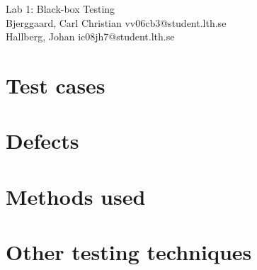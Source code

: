 \documentclass[titlepage]{article}
\begin{document}
\begin{center}
	\huge{Lab 1: Black-box Testing } \\
	\small{Bjerggaard, Carl Christian vv06cb3@student.lth.se \\Hallberg, Johan ic08jh7@student.lth.se}

\vspace*{1cm}

\end{center}

\thispagestyle{empty}

\clearpage
\section{Test cases}


\section{Defects}

\section{Methods used}


\section{Other testing techniques}
\end{document}
